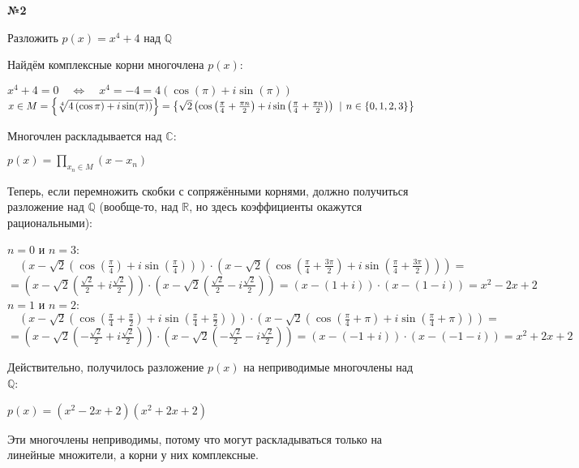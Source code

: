 \documentclass{article}
\newenvironment{task}{\begin{center}\fontsize{14}{14}\selectfont\bf}{\rm\fontsize{12}{12}\selectfont\end{center}}
\begin{document}
	\begin{task} 
		№2
	\end{task}
	\begin{center}
		Разложить $p(x) = x^4 + 4$ над $\mathbb{Q}$\\
	\end{center}
	Найдём комплексные корни многочлена $p(x)$:
	\begin{center}
		$x^4 + 4 = 0 \quad\Leftrightarrow\quad x^4 = -4 = 4\left(\cos(\pi) + i\sin(\pi)\right)$ \\
		$x \in M = \left\lbrace \sqrt[4]{4\left(\cos\pi) + i\sin(\pi)\right)} \right\rbrace = \left\lbrace \sqrt{2}\left(\cos\left(\frac{\pi}{4} + \frac{\pi n}{2}\right) + i\sin\left(\frac{\pi}{4} + \frac{\pi n}{2}\right)\right) \hspace{4px}|\hspace{4px} n \in \lbrace0, 1, 2, 3\rbrace \right\rbrace$
	\end{center}
	Многочлен раскладывается над  $\mathbb{C}$:
	\begin{center}
		$p(x) = \prod\limits_{x_n \in M} (x - x_n)$
	\end{center}
	Теперь, если перемножить скобки с сопряжёнными корнями, должно получиться разложение над $\mathbb{Q}$ (вообще-то, над $\mathbb{R}$, но здесь коэффициенты окажутся рациональными):
	\begin{center}
		$n=0$ и $n=3$: $\quad\left( x - \sqrt{2}\left(\cos\left(\frac{\pi}{4}\right) + i\sin\left(\frac{\pi}{4}\right)\right)\right) 
		\cdot 
		\left(x - \sqrt{2}\left(\cos\left(\frac{\pi}{4} + \frac{3\pi}{2}\right) + i\sin\left(\frac{\pi}{4} + \frac{3\pi}{2}\right)\right) \right) = $\\
		$= \left( x - \sqrt{2}\left(\frac{\sqrt{2}}{2} + i\frac{\sqrt{2}}{2}\right)\right) 
		\cdot 
		\left(x - \sqrt{2}\left(\frac{\sqrt{2}}{2} - i\frac{\sqrt{2}}{2}\right) \right) 
		= \left( x - (1 + i)\right) 
		\cdot 
		\left(x - (1-i) \right) = x^2 -2x + 2 $\\
		\vspace{5px}
		$n=1$ и $n=2$: $\quad\left( x - \sqrt{2}\left(\cos\left(\frac{\pi}{4} + \frac{\pi}{2}\right) + i\sin\left(\frac{\pi}{4} + \frac{\pi}{2}\right)\right)\right) 
		\cdot 
		\left(x - \sqrt{2}\left(\cos\left(\frac{\pi}{4} + \pi\right) + i\sin\left(\frac{\pi}{4} + \pi\right)\right) \right) = $\\
		$= \left( x - \sqrt{2}\left(-\frac{\sqrt{2}}{2} + i\frac{\sqrt{2}}{2}\right)\right) 
		\cdot 
		\left(x - \sqrt{2}\left(-\frac{\sqrt{2}}{2} - i\frac{\sqrt{2}}{2}\right) \right) 
		= \left( x - (-1 + i)\right) 
		\cdot 
		\left(x - (-1-i) \right) = x^2 + 2x + 2 $
	\end{center}
	Действительно, получилось разложение $p(x)$ на неприводимые многочлены над $\mathbb{Q}$:
	\begin{center}
		$p(x) = (x^2 - 2x + 2)(x^2 + 2x + 2)$
	\end{center}
	 Эти многочлены неприводимы, потому что могут раскладываться только на линейные множители, а корни у них комплексные. 
	
\end{document}
